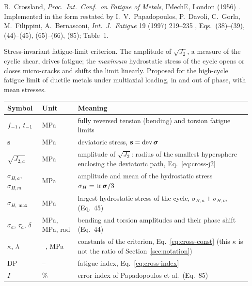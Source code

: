 \label{sheet:CROSSLAND}

 B.~Crossland, \emph{Proc.\ Int.\ Conf.\ on Fatigue of Metals}, IMechE, London (1956)
\cite{crossland1956}. Implemented in the form restated by I.~V.~Papadopoulos, P.~Davoli, C.~Gorla,
M.~Filippini, A.~Bernasconi, \emph{Int.\ J.\ Fatigue} 19 (1997) 219--235 \cite{papadopoulos1997},
Eqs.~(38)--(39), (44)--(45), (65)--(66), (85); Table~1.

 Stress-invariant fatigue-limit criterion. The amplitude of $\sqrt{J_2}$, a
measure of the cyclic shear, drives fatigue; the \emph{maximum} hydrostatic stress of the cycle
opens or closes micro-cracks and shifts the limit linearly. Proposed for the high-cycle fatigue
limit of ductile metals under multiaxial loading, in and out of phase, with mean stresses.

\begin{center}\small
\begin{tabular}{@{}llp{100mm}@{}}
\toprule
Symbol & Unit & Meaning\\\midrule
$f_{-1}$, $t_{-1}$ & MPa & fully reversed tension (bending) and torsion fatigue limits\\
$\mathbf s$ & MPa & deviatoric stress, $\mathbf s=\operatorname{dev}\boldsymbol\sigma$\\
$\sqrt{J_{2,a}}$ & MPa & amplitude of $\sqrt{J_2}$: radius of the smallest hypersphere enclosing the deviatoric path, Eq.~\eqref{eq:cross-j2}\\
$\sigma_{H,a}$, $\sigma_{H,m}$ & MPa & amplitude and mean of the hydrostatic stress $\sigma_H=\operatorname{tr}\boldsymbol\sigma/3$\\
$\sigma_{H,\max}$ & MPa & largest hydrostatic stress of the cycle, $\sigma_{H,a}+\sigma_{H,m}$ (Eq.~45)\\
$\sigma_a$, $\tau_a$, $\delta$ & MPa, MPa, rad & bending and torsion amplitudes and their phase shift (Eq.~44)\\
$\kappa$, $\lambda$ & --, MPa & constants of the criterion, Eq.~\eqref{eq:cross-const} (this $\kappa$ is not the ratio of Section~\ref{sec:notation})\\
$\mathrm{DP}$ & -- & fatigue index, Eq.~\eqref{eq:cross-index}\\
$I$ & \% & error index of Papadopoulos et al.\ (Eq.~85)\\
\bottomrule
\end{tabular}
\end{center}


